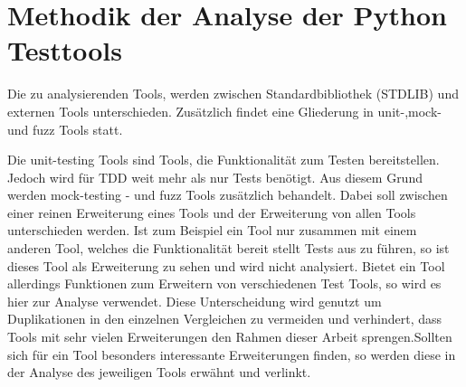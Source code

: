 \section{Methodik der Analyse der Python Testtools}\label{methodik}
Die zu analysierenden Tools, werden zwischen Standardbibliothek (STDLIB) und 
externen Tools unterschieden. Zusätzlich findet eine Gliederung in 
unit-,\gls{mock}- und \gls{fuzz} Tools statt.

Die unit-testing Tools sind Tools, die Funktionalität zum Testen bereitstellen.
Jedoch wird für TDD weit mehr als nur Tests benötigt. Aus diesem Grund werden
\gls{mock}-testing - und \gls{fuzz} Tools zusätzlich behandelt. Dabei soll
zwischen einer reinen Erweiterung eines Tools und der Erweiterung von allen
Tools unterschieden werden. Ist zum Beispiel ein Tool nur zusammen mit einem
anderen Tool, welches die Funktionalität bereit stellt Tests aus zu führen,
so ist dieses Tool als Erweiterung zu sehen und wird nicht analysiert. Bietet
ein Tool allerdings Funktionen zum Erweitern von verschiedenen Test Tools, so
wird es hier zur  Analyse verwendet. Diese Unterscheidung wird genutzt um
Duplikationen in den einzelnen Vergleichen zu vermeiden und verhindert, dass
Tools mit sehr vielen Erweiterungen den Rahmen dieser Arbeit sprengen.Sollten
sich für ein Tool besonders interessante Erweiterungen finden, so werden diese
in der Analyse des jeweiligen Tools erwähnt und verlinkt.
\newline

